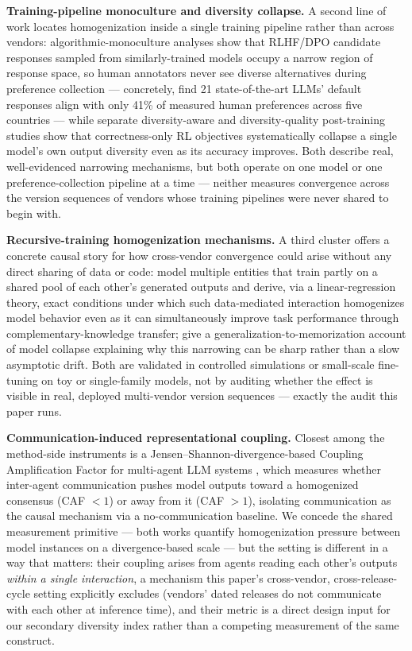 \documentclass[11pt]{article}
\begin{document}
\textbf{Training-pipeline monoculture and diversity collapse.} A second line of work locates homogenization inside a single training pipeline rather than across vendors: algorithmic-monoculture analyses \citep{CommunityAlignmentMonoculture} show that RLHF/DPO candidate responses sampled from similarly-trained models occupy a narrow region of response space, so human annotators never see diverse alternatives during preference collection --- concretely, \citet{CommunityAlignmentMonoculture} find 21 state-of-the-art LLMs' default responses align with only 41\% of measured human preferences across five countries --- while separate diversity-aware \citep{DiversityAwarePO} and diversity-quality \citep{DQO} post-training studies show that correctness-only RL objectives systematically collapse a single model's own output diversity even as its accuracy improves. Both describe real, well-evidenced narrowing mechanisms, but both operate on one model or one preference-collection pipeline at a time --- neither measures convergence across the version sequences of vendors whose training pipelines were never shared to begin with.

\textbf{Recursive-training homogenization mechanisms.} A third cluster offers a concrete causal story for how cross-vendor convergence could arise without any direct sharing of data or code: \citet{MultiEntityRecursion} model multiple entities that train partly on a shared pool of each other's generated outputs and derive, via a linear-regression theory, exact conditions under which such data-mediated interaction homogenizes model behavior even as it can simultaneously improve task performance through complementary-knowledge transfer; \citet{ModelCollapseMemorization} give a generalization-to-memorization account of model collapse explaining why this narrowing can be sharp rather than a slow asymptotic drift. Both are validated in controlled simulations or small-scale fine-tuning on toy or single-family models, not by auditing whether the effect is visible in real, deployed multi-vendor version sequences --- exactly the audit this paper runs.

\textbf{Communication-induced representational coupling.} Closest among the method-side instruments is a Jensen--Shannon-divergence-based Coupling Amplification Factor for multi-agent LLM systems \citep{BoundarySyncRepCoupling2607}, which measures whether inter-agent communication pushes model outputs toward a homogenized consensus (CAF $<1$) or away from it (CAF $>1$), isolating communication as the causal mechanism via a no-communication baseline. We concede the shared measurement primitive --- both works quantify homogenization pressure between model instances on a divergence-based scale --- but the setting is different in a way that matters: their coupling arises from agents reading each other's outputs \emph{within a single interaction}, a mechanism this paper's cross-vendor, cross-release-cycle setting explicitly excludes (vendors' dated releases do not communicate with each other at inference time), and their metric is a direct design input for our secondary diversity index rather than a competing measurement of the same construct.
\end{document}
